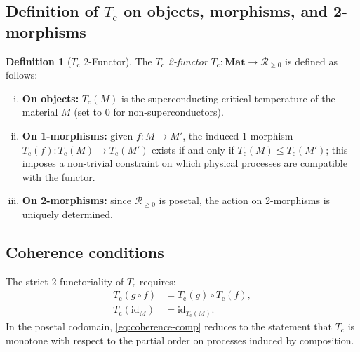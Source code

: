 \documentclass[12pt,a4paper]{article}
\theoremstyle{plain}
\theoremstyle{definition}
\newtheorem{definition}[theorem]{Definition}
\theoremstyle{remark}
\newcommand{\Tc}{T_{\mathrm{c}}}
\newcommand{\Matl}{\mathbf{Mat}}
\newcommand{\id}{\mathrm{id}}
\begin{document}
\subsection{Definition of $\Tc$ on objects, morphisms, and 2-morphisms}

\begin{definition}[$\Tc$ 2-Functor]\label{def:Tc-functor}
The \emph{$\Tc$ 2-functor} $\Tc \colon \Matl \to \mathscr{R}_{\geq 0}$ is
defined as follows:
\begin{enumerate}[(i)]
  \item \textbf{On objects:} $\Tc(M)$ is the superconducting critical
    temperature of the material $M$ (set to $0$ for non-superconductors).
  \item \textbf{On 1-morphisms:} given $f \colon M \to M'$, the induced
    1-morphism $\Tc(f) \colon \Tc(M) \to \Tc(M')$ exists if and only if
    $\Tc(M) \leq \Tc(M')$; this imposes a non-trivial constraint on
    which physical processes are compatible with the functor.
  \item \textbf{On 2-morphisms:} since $\mathscr{R}_{\geq 0}$ is posetal,
    the action on 2-morphisms is uniquely determined.
\end{enumerate}
\end{definition}

\subsection{Coherence conditions}

The strict 2-functoriality of $\Tc$ requires:
\begin{align}
  \Tc(g \circ f) &= \Tc(g) \circ \Tc(f),
    \label{eq:coherence-comp} \\
  \Tc(\id_M) &= \id_{\Tc(M)}.
    \label{eq:coherence-id}
\end{align}
In the posetal codomain, \eqref{eq:coherence-comp} reduces to the statement
that $\Tc$ is monotone with respect to the partial order on processes induced
by composition.
\end{document}
